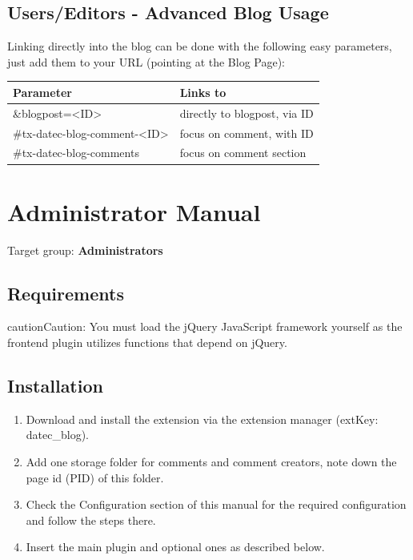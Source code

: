 \documentclass[a4paper,10pt,english]{sphinxmanual}
\begin{document}
\section{Users/Editors - Advanced Blog Usage}
\label{UsersManual/Index:users-editors-advanced-blog-usage}
Linking directly into the blog can be done with the following easy parameters, just add them to your URL (pointing at the Blog Page):

\begin{tabulary}{\linewidth}{|L|L|}
\hline
\textsf{\relax 
Parameter
} & \textsf{\relax 
Links to
}\\
\hline
\&blogpost=\textless{}ID\textgreater{}
 & 
directly to blogpost, via ID
\\
\hline
\#tx-datec-blog-comment-\textless{}ID\textgreater{}
 & 
focus on comment, with ID
\\
\hline
\#tx-datec-blog-comments
 & 
focus on comment section
\\
\hline\end{tabulary}



\chapter{Administrator Manual}
\label{AdministratorManual/Index:administrator-manual}\label{AdministratorManual/Index::doc}\label{AdministratorManual/Index:admin-manual}
Target group: \textbf{Administrators}


\section{Requirements}
\label{AdministratorManual/Index:requirements}
\begin{notice}{caution}{Caution:}
You must load the jQuery JavaScript framework yourself as the frontend plugin utilizes functions that depend on jQuery.
\end{notice}


\section{Installation}
\label{AdministratorManual/Index:installation}\begin{enumerate}
\item {} 
Download and install the extension via the extension manager (extKey: datec\_blog).

\item {} 
Add one storage folder for comments and comment creators, note down the page id (PID) of this folder.

\item {} 
Check the Configuration section of this manual for the required configuration and follow the steps there.

\item {} 
Insert the main plugin and optional ones as described below.

\end{enumerate}
\end{document}
